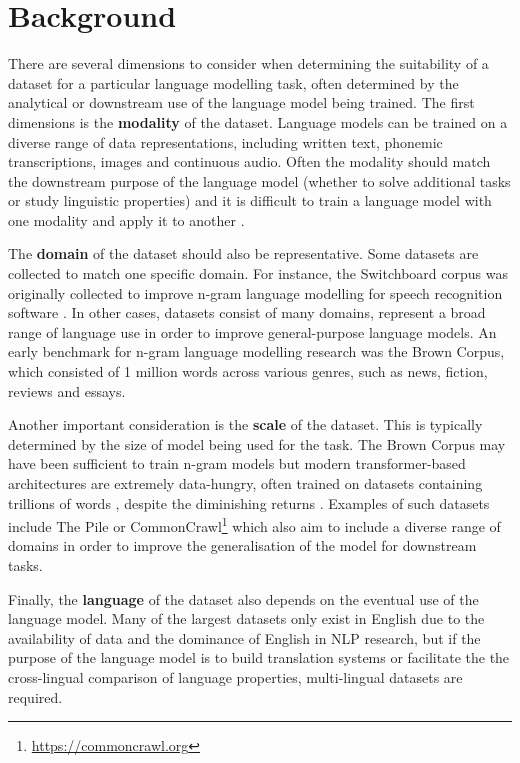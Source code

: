 \section{Background}
\label{sec:dataset-background}

There are several dimensions to consider when determining the suitability of a dataset for a particular language modelling task, often determined by the analytical or downstream use of the language model being trained. The first dimensions is the \textbf{modality} of the dataset. Language models can be trained on a diverse range of data representations, including written text, phonemic transcriptions, images and continuous audio. Often the modality should match the downstream purpose of the language model (whether to solve additional tasks or study linguistic properties) and it is difficult to train a language model with one modality and apply it to another \citep{suvarna-etal-2024-phonologybench,lavechin}.

The \textbf{domain} of the dataset should also be representative. Some datasets are collected to match one specific domain. For instance, the Switchboard corpus was originally collected to improve n-gram language modelling for speech recognition software \citep{godfrey1992switchboard}. In other cases, datasets consist of many domains, represent a broad range of language use in order to improve general-purpose language models. An early benchmark for n-gram language modelling research was the Brown Corpus, which consisted of 1 million words across various genres, such as news, fiction, reviews and essays\citep{francis1979brown}.

Another important consideration is the \textbf{scale} of the dataset. This is typically determined by the size of model being used for the task. The Brown Corpus may have been sufficient to train n-gram models but modern transformer-based architectures are extremely data-hungry, often trained on datasets containing trillions of words \citep{elazar-2024-redpajama}, despite the diminishing returns \citep{kaplan2020scaling}. Examples of such datasets include The Pile \citep{pile} or CommonCrawl\footnote{\url{https://commoncrawl.org}} which also aim to include a diverse range of domains in order to improve the generalisation of the model for downstream tasks.

Finally, the \textbf{language} of the dataset also depends on the eventual use of the language model. Many of the largest datasets only exist in English due to the availability of data and the dominance of English in NLP research, but if the purpose of the language model is to build translation systems or facilitate the the cross-lingual comparison of language properties, multi-lingual datasets are required.

